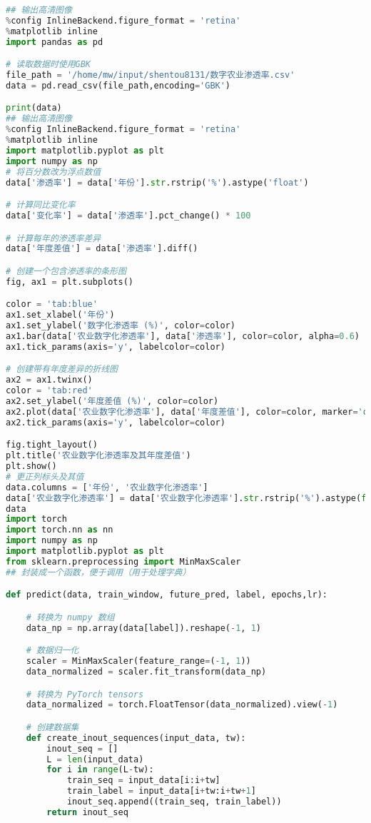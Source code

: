 \begin{lstlisting}[language=python,caption={数字农业渗透}]
## 输出高清图像
%config InlineBackend.figure_format = 'retina'
%matplotlib inline
import pandas as pd

# 读取数据时使用GBK
file_path = '/home/mw/input/shentou8131/数字农业渗透率.csv'
data = pd.read_csv(file_path,encoding='GBK')

print(data)
## 输出高清图像
%config InlineBackend.figure_format = 'retina'
%matplotlib inline
import matplotlib.pyplot as plt
import numpy as np
# 将百分数改为浮点数值
data['渗透率'] = data['年份'].str.rstrip('%').astype('float')

# 计算同比变化率
data['变化率'] = data['渗透率'].pct_change() * 100

# 计算每年的渗透率差异
data['年度差值'] = data['渗透率'].diff()

# 创建一个包含渗透率的条形图
fig, ax1 = plt.subplots()

color = 'tab:blue'
ax1.set_xlabel('年份')
ax1.set_ylabel('数字化渗透率 (%)', color=color)
ax1.bar(data['农业数字化渗透率'], data['渗透率'], color=color, alpha=0.6)
ax1.tick_params(axis='y', labelcolor=color)

# 创建带有年度差异的折线图
ax2 = ax1.twinx()  
color = 'tab:red'
ax2.set_ylabel('年度差值 (%)', color=color)  
ax2.plot(data['农业数字化渗透率'], data['年度差值'], color=color, marker='o', linestyle='-', linewidth=2)
ax2.tick_params(axis='y', labelcolor=color)

fig.tight_layout()  
plt.title('农业数字化渗透率及其年度差值')
plt.show()
# 更正列标头及其值
data.columns = ['年份', '农业数字化渗透率']
data['农业数字化渗透率'] = data['农业数字化渗透率'].str.rstrip('%').astype(float) / 100
data
import torch
import torch.nn as nn
import numpy as np
import matplotlib.pyplot as plt
from sklearn.preprocessing import MinMaxScaler
## 封装成一个函数，便于调用（用于处理字典）

def predict(data, train_window, future_pred, label, epochs,lr):

    # 转换为 numpy 数组
    data_np = np.array(data[label]).reshape(-1, 1)

    # 数据归一化
    scaler = MinMaxScaler(feature_range=(-1, 1))
    data_normalized = scaler.fit_transform(data_np)

    # 转换为 PyTorch tensors
    data_normalized = torch.FloatTensor(data_normalized).view(-1)

    # 创建数据集
    def create_inout_sequences(input_data, tw):
        inout_seq = []
        L = len(input_data)
        for i in range(L-tw):
            train_seq = input_data[i:i+tw]
            train_label = input_data[i+tw:i+tw+1]
            inout_seq.append((train_seq, train_label))
        return inout_seq


\end{lstlisting}
